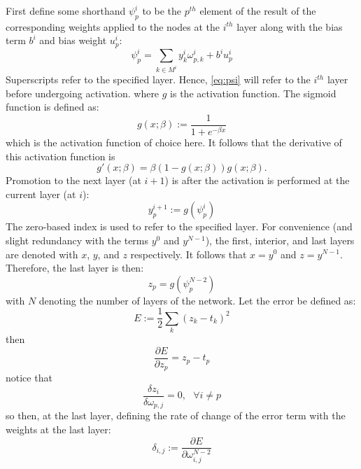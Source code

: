 \documentclass{article}
\begin{document}
First define some shorthand $\psi_p^i$ to be the $p^{th}$ element of the result of the corresponding weights applied to the nodes at the $i^{th}$ layer along with the bias term $b^i$ and bias weight $u_p^i$:
%
\begin{equation} \label{eq:psi}
\psi_p^i = \sum_{k \in M^i} y_k^i \omega_{p,k}^i + b^iu_p^i
\end{equation}
%
Superscripts refer to the specified layer.
Hence, \eqref{eq:psi} will refer to the $i^{th}$ layer before undergoing activation.
%
where $g$ is the activation function. The sigmoid function is defined as:
%
\begin{equation} \label{eq:g}
g(x;\beta) := \frac{1}{1 + e^{-\beta x}}
\end{equation}
%
which is the activation function of choice here.
It follows that the derivative of this activation function is
%
\begin{equation} \label{eq:gp}
g'(x;\beta) = \beta \left( 1 - g(x;\beta) \right) g(x; \beta).
\end{equation}
%
Promotion to the next layer (at $i+1$) is after the activation is performed at the current layer (at $i$):
%
\begin{equation} \label{eq:z}
y_p^{i+1} := g(\psi_p^i)
\end{equation}
%
The zero-based index is used to refer to the specified layer.
For convenience (and slight redundancy with the terms $y^0$ and $y^{N-1}$), the first, interior, and last layers are denoted with $x$, $y$, and $z$ respectively.
It follows that $x = y^0$ and $z = y^{N-1}$.
Therefore, the last layer is then:
%
\begin{equation} \label{eq:z}
z_p = g(\psi_p^{N-2})
\end{equation}
%
with $N$ denoting the number of layers of the network.
%
Let the error be defined as:
%
\begin{equation} \label{eq:error}
E := \frac{1}{2} \sum_k (z_k - t_k)^2
\end{equation}
%
then
%
\begin{equation} \label{eq:derror}
\frac{\partial E}{\partial z_p} = z_p - t_p
\end{equation}
%
notice that
%
\begin{equation} \label{eq:last_layer_derror_eq_0}
\frac{\delta z_i}{\delta \omega_{p,j}} = 0, \ \ \ \forall i \neq p
\end{equation}
%
so then, at the last layer, defining the rate of change of the error term with the weights at the last layer:
%
\begin{equation} \label{eq:delta}
\delta_{i,j} := \frac{\partial E}{\partial \omega_{i,j}^{N-2}}
\end{equation}
\end{document}
